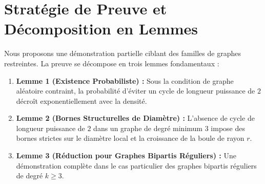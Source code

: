 \documentclass[11pt,a4paper]{article}
\theoremstyle{definition}
\begin{document}
\section{Stratégie de Preuve et Décomposition en Lemmes}
Nous proposons une démonstration partielle ciblant des familles de graphes restreintes. La preuve se décompose en trois lemmes fondamentaux :
\begin{enumerate}
    \item \textbf{Lemme 1 (Existence Probabiliste) :} Sous la condition de graphe aléatoire contraint, la probabilité d'éviter un cycle de longueur puissance de $2$ décroît exponentiellement avec la densité.
    \item \textbf{Lemme 2 (Bornes Structurelles de Diamètre) :} L'absence de cycle de longueur puissance de $2$ dans un graphe de degré minimum $3$ impose des bornes strictes sur le diamètre local et la croissance de la boule de rayon $r$.
    \item \textbf{Lemme 3 (Réduction pour Graphes Bipartis Réguliers) :} Une démonstration complète dans le cas particulier des graphes bipartis réguliers de degré $k \ge 3$.
\end{enumerate}
\end{document}

